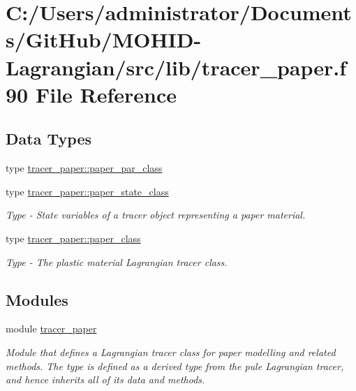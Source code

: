 \hypertarget{tracer__paper_8f90}{}\section{C\+:/\+Users/administrator/\+Documents/\+Git\+Hub/\+M\+O\+H\+I\+D-\/\+Lagrangian/src/lib/tracer\+\_\+paper.f90 File Reference}
\label{tracer__paper_8f90}
\subsection*{Data Types}
\begin{DoxyCompactItemize}
\item 
type \mbox{\hyperlink{structtracer__paper_1_1paper__par__class}{tracer\+\_\+paper\+::paper\+\_\+par\+\_\+class}}
\item 
type \mbox{\hyperlink{structtracer__paper_1_1paper__state__class}{tracer\+\_\+paper\+::paper\+\_\+state\+\_\+class}}
\begin{DoxyCompactList}\small\item\em Type -\/ State variables of a tracer object representing a paper material. \end{DoxyCompactList}\item 
type \mbox{\hyperlink{structtracer__paper_1_1paper__class}{tracer\+\_\+paper\+::paper\+\_\+class}}
\begin{DoxyCompactList}\small\item\em Type -\/ The plastic material Lagrangian tracer class. \end{DoxyCompactList}\end{DoxyCompactItemize}
\subsection*{Modules}
\begin{DoxyCompactItemize}
\item 
module \mbox{\hyperlink{namespacetracer__paper}{tracer\+\_\+paper}}
\begin{DoxyCompactList}\small\item\em Module that defines a Lagrangian tracer class for paper modelling and related methods. The type is defined as a derived type from the pule Lagrangian tracer, and hence inherits all of it\textquotesingle{}s data and methods. \end{DoxyCompactList}\end{DoxyCompactItemize}
